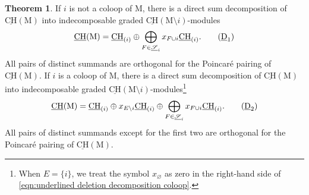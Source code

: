 \documentclass[11pt,reqno]{amsart}
\theoremstyle{definition}
\newtheorem{theorem}{Theorem}[section]
\theoremstyle{remark}
\renewcommand{\(}{\left(}
\renewcommand{\)}{\right)}
\newcommand{\<}{\left<}
\renewcommand{\>}{\right>}
\begin{document}
\begin{theorem}\label{TheoremUnderlinedDecomposition}
If $i$ is not a coloop of $\mathrm{M}$,   there is  a direct sum decomposition of $\underline{\mathrm{CH}}(\mathrm{M}) $ into indecomposable graded $\underline{\mathrm{CH}}(\mathrm{M}\setminus i)$-modules
\begin{equation} \label{eqn:underlined deletion decomposition}
\underline{\mathrm{CH}}(\mathrm{M}) = \underline{\mathrm{CH}}_{(i)} \oplus \bigoplus_{F \in \underline{\mathscr{S}}_i} x_{F\cup i} \underline{\mathrm{CH}}_{(i)}. \tag{$\underline{\mathrm{D}}_1$}
\end{equation}
All pairs of distinct summands are orthogonal for the Poincar\'e pairing of $\underline{\mathrm{CH}}(\mathrm{M})$.
If $i$ is a coloop of $\mathrm{M}$,  there is a direct sum decomposition of $\underline{\mathrm{CH}}(\mathrm{M}) $ into indecomposable graded  $\underline{\mathrm{CH}}(\mathrm{M}\setminus i)$-modules\footnote{When $E = \{i\}$, we treat the symbol $x_\varnothing$ 
as zero in the right-hand side of  \eqref{eqn:underlined deletion decomposition coloop}.}
\begin{equation} \label{eqn:underlined deletion decomposition coloop}
\underline{\mathrm{CH}}(\mathrm{M}) = \underline{\mathrm{CH}}_{(i)} \oplus x_{E\setminus i}\underline{\mathrm{CH}}_{(i)} \oplus \bigoplus_{F\in \underline{\mathscr{S}}_i} x_{F\cup i} \underline{\mathrm{CH}}_{(i)}. \tag{$\underline{\mathrm{D}}_2$}
\end{equation}
All pairs of distinct summands except for the first two are orthogonal for the Poincar\'e pairing of $\underline{\mathrm{CH}}(\mathrm{M})$.
\end{theorem}
\end{document}
